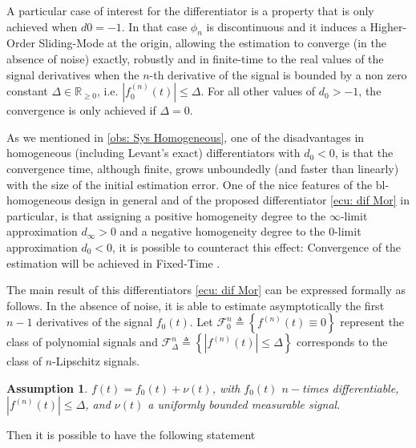 \documentclass[11pt,letterpaper,twoside,openright]{report}
\newcommand{\RE}{\mathbb{R}}
\newtheorem{assumtion}{Assumption}[chapter]
\begin{document}
A particular case of interest for the differentiator is a property that is only achieved when $d0 = -1$. In that case $\phi_n$ is discontinuous and it induces a Higher-Order Sliding-Mode at the origin, allowing the estimation to converge (in the absence of noise) exactly, robustly and in finite-time to the real values of the signal derivatives when the $n$-th derivative of the signal is bounded by a non zero constant $\Delta \in \RE_{\geq 0}$, i.e. $|f_0^{(n)}(t)|\leq \Delta$. For all other values of $d_0 > -1$, the convergence is only achieved if $\Delta=0$.

As we mentioned in \ref{obs: Sys Homogeneous}, one of the disadvantages in homogeneous (including Levant’s exact) differentiators with $d_0 < 0$, is that the convergence time, although finite, grows unboundedly (and faster than linearly) with the size of the initial estimation error. One of the nice features of the bl-homogeneous design in general and of the proposed differentiator \eqref{ecu: dif Mor} in particular, is that assigning a positive homogeneity degree to the $\infty$-limit approximation $d_{\infty} > 0$ and a negative homogeneity degree to the $0$-limit approximation $d_0 < 0$, it is possible to counteract this effect: Convergence of the estimation will be achieved in Fixed-Time \cite{Moreno2021}.

The main result of this differentiators \eqref{ecu: dif Mor} can be expressed formally as follows. In the absence of noise, it is able to estimate asymptotically the first $n-1$ derivatives of the signal $f_0(t)$. Let $\mathscr{F}^{n}_{0} \triangleq \left\lbrace f^{(n)}(t) \equiv 0 \right\rbrace$ represent the class of polynomial signals and $\mathscr{F}^{n}_{\Delta} \triangleq \left\lbrace \left| f^{(n)}(t)\right| \leq \Delta \right\rbrace$ corresponds to the class of $n$-Lipschitz signals.

\begin{assumtion}\label{asump: blh differentiator}
	$f(t)=f_0(t)+\nu(t)$, with $f_0(t)$ $n-$times differentiable, $|f^{(n)}(t)|\leq \Delta$, and $\nu(t)$ a uniformly bounded measurable signal.
\end{assumtion}
Then it is possible to have the following statement
\end{document}
